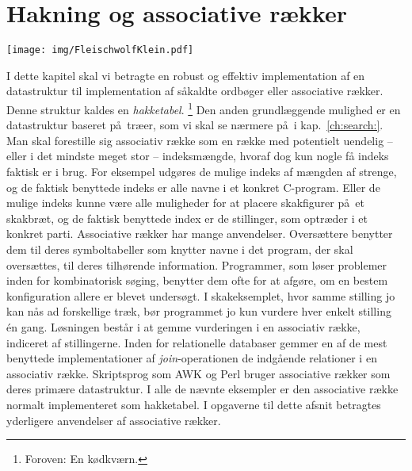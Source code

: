 \chapter{Hakning og associative rækker}

\renewcommand{\labelprefix}{ch:hash}
\llabel{}
\vspace*{-3.5cm}
\begin{flushright}
\texttt{[image: img/FleischwolfKlein.pdf]}
\end{flushright}

I dette kapitel skal vi betragte en robust og effektiv implementation af en datastruktur til implementation af såkaldte ordbøger eller associative rækker.
Denne struktur kaldes en \emph{hakketabel}.
\footnote{Foroven: En kødkværn.}
Den anden grundlæggende mulighed er en datastruktur baseret på træer, som vi skal se nærmere på i kap.~\ref{ch:search:}.
Man skal forestille sig associativ række som en række med potentielt uendelig -- eller i det mindste meget stor -- indeksmængde, hvoraf dog kun nogle få indeks faktisk er i brug.
For eksempel udgøres de mulige indeks af mængden af strenge, og de faktisk benyttede indeks er alle navne i et konkret C-program.
Eller de mulige indeks kunne være alle muligheder for at placere skakfigurer på et skakbræt,
og de faktisk benyttede index er de stillinger, som optræder i et konkret parti.
Associative rækker har mange anvendelser.
Oversættere
benytter dem til deres symboltabeller
som knytter navne i det program, der skal oversættes, til deres tilhørende information.
Programmer, som løser problemer inden for kombinatorisk søging,
benytter dem ofte for at afgøre, om en bestem konfiguration allere er blevet undersøgt.
I skakeksemplet, hvor samme stilling jo kan nås ad forskellige træk, bør programmet jo kun vurdere hver enkelt stilling én gang.
Løsningen består i at gemme vurderingen i en associativ række, indiceret af stillingerne.
Inden for relationelle databaser gemmer en af de mest benyttede implementationer af \emph{join}-operationen
 de indgående relationer i en associativ række.
Skriptsprog som 
AWK \cite{AWK88} og Perl \cite{WCO00} bruger associative rækker som deres primære datastruktur.
I alle de nævnte eksempler er den associative række normalt implementeret som hakketabel.
I opgaverne til dette afsnit betragtes yderligere anvendelser af associative rækker.

